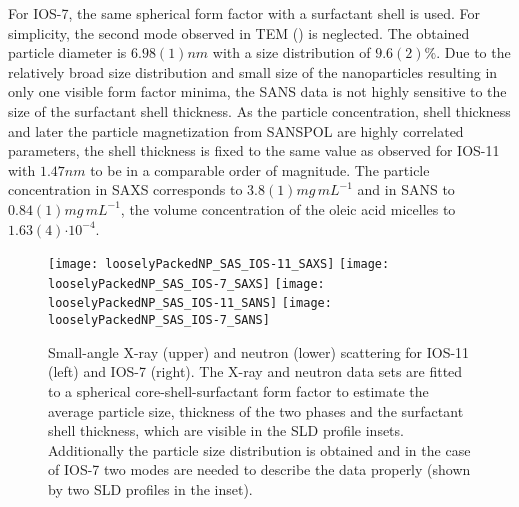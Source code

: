 \documentclass[\main/dresen_thesis.tex]{subfiles}
\begin{document}
    For IOS-7, the same spherical form factor with a surfactant shell is used.
    For simplicity, the second mode observed in TEM () is neglected.
    The obtained particle diameter is $6.98(1) \unit{nm}$ with a size distribution of $9.6(2) \unit{\%}$.
    Due to the relatively broad size distribution and small size of the nanoparticles resulting in only one visible form factor minima, the SANS data is not highly sensitive to the size of the surfactant shell thickness.
    As the particle concentration, shell thickness and later the particle magnetization from SANSPOL are highly correlated parameters, the shell thickness is fixed to the same value as observed for IOS-11 with $1.47 \unit{nm}$ to be in a comparable order of magnitude.
    The particle concentration in SAXS corresponds to $3.8(1) \unit{mg \, mL^{-1}}$ and in SANS to $0.84(1) \unit{mg \, mL^{-1}}$, the volume concentration of the oleic acid micelles to $1.63(4) \unit{\cdot 10^{-4}}$.

    \begin{figure}[!htbp]
      \centering
      \texttt{[image: looselyPackedNP\_SAS\_IOS-11\_SAXS]}
      \texttt{[image: looselyPackedNP\_SAS\_IOS-7\_SAXS]}
      \texttt{[image: looselyPackedNP\_SAS\_IOS-11\_SANS]}
      \texttt{[image: looselyPackedNP\_SAS\_IOS-7\_SANS]}
      \caption{\label{fig:looselyPackedNP:nanoparticle:sas}Small-angle X-ray (upper) and neutron (lower) scattering for IOS-11 (left) and IOS-7 (right). The X-ray and neutron data sets are fitted to a spherical core-shell-surfactant form factor to estimate the average particle size, thickness of the two phases and the surfactant shell thickness, which are visible in the SLD profile insets. Additionally the particle size distribution is obtained and in the case of IOS-7 two modes are needed to describe the data properly (shown by two SLD profiles in the inset).}
    \end{figure}
\end{document}
